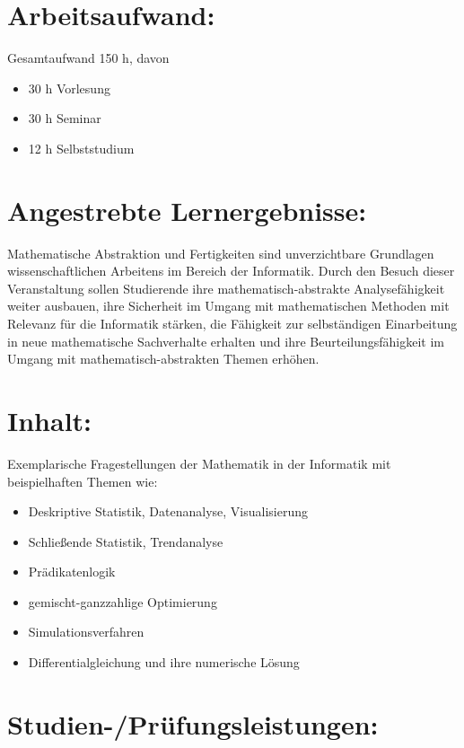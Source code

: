 \section*{Arbeitsaufwand:}\label{arbeitsaufwand-2}

Gesamtaufwand 150 h, davon

\begin{itemize}
\tightlist
\item
  30 h Vorlesung
\item
  30 h Seminar
\item
  12 h Selbststudium
\end{itemize}

\section*{Angestrebte
Lernergebnisse:}\label{angestrebte-lernergebnisse-2}

Mathematische Abstraktion und Fertigkeiten sind unverzichtbare
Grundlagen wissenschaftlichen Arbeitens im Bereich der Informatik. Durch
den Besuch dieser Veranstaltung sollen Studierende ihre
mathematisch-abstrakte Analysefähigkeit weiter ausbauen, ihre Sicherheit
im Umgang mit mathematischen Methoden mit Relevanz für die Informatik
stärken, die Fähigkeit zur selbständigen Einarbeitung in neue
mathematische Sachverhalte erhalten und ihre Beurteilungsfähigkeit im
Umgang mit mathematisch-abstrakten Themen erhöhen.

\section*{Inhalt:}\label{inhalt-2}

Exemplarische Fragestellungen der Mathematik in der Informatik mit
beispielhaften Themen wie:

\begin{itemize}
\tightlist
\item
  Deskriptive Statistik, Datenanalyse, Visualisierung
\item
  Schließende Statistik, Trendanalyse
\item
  Prädikatenlogik
\item
  gemischt-ganzzahlige Optimierung
\item
  Simulationsverfahren
\item
  Differentialgleichung und ihre numerische Lösung
\end{itemize}

\section*{Studien-/Prüfungsleistungen:}\label{studien-pruxfcfungsleistungen-2}

